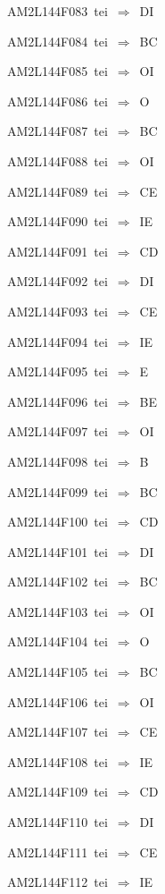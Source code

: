 {\sixrm AM2L144F083\ {\sixit tei}\ }$\Rightarrow$\ DI\par\smallskip
{\sixrm AM2L144F084\ {\sixit tei}\ }$\Rightarrow$\ BC\par\smallskip
{\sixrm AM2L144F085\ {\sixit tei}\ }$\Rightarrow$\ OI\par\smallskip
{\sixrm AM2L144F086\ {\sixit tei}\ }$\Rightarrow$\ O\par\smallskip
{\sixrm AM2L144F087\ {\sixit tei}\ }$\Rightarrow$\ BC\par\smallskip
{\sixrm AM2L144F088\ {\sixit tei}\ }$\Rightarrow$\ OI\par\smallskip
{\sixrm AM2L144F089\ {\sixit tei}\ }$\Rightarrow$\ CE\par\smallskip
{\sixrm AM2L144F090\ {\sixit tei}\ }$\Rightarrow$\ IE\par\smallskip
{\sixrm AM2L144F091\ {\sixit tei}\ }$\Rightarrow$\ CD\par\smallskip
{\sixrm AM2L144F092\ {\sixit tei}\ }$\Rightarrow$\ DI\par\smallskip
{\sixrm AM2L144F093\ {\sixit tei}\ }$\Rightarrow$\ CE\par\smallskip
{\sixrm AM2L144F094\ {\sixit tei}\ }$\Rightarrow$\ IE\par\smallskip
{\sixrm AM2L144F095\ {\sixit tei}\ }$\Rightarrow$\ E\par\smallskip
{\sixrm AM2L144F096\ {\sixit tei}\ }$\Rightarrow$\ BE\par\smallskip
{\sixrm AM2L144F097\ {\sixit tei}\ }$\Rightarrow$\ OI\par\smallskip
{\sixrm AM2L144F098\ {\sixit tei}\ }$\Rightarrow$\ B\par\smallskip
{\sixrm AM2L144F099\ {\sixit tei}\ }$\Rightarrow$\ BC\par\smallskip
{\sixrm AM2L144F100\ {\sixit tei}\ }$\Rightarrow$\ CD\par\smallskip
{\sixrm AM2L144F101\ {\sixit tei}\ }$\Rightarrow$\ DI\par\smallskip
{\sixrm AM2L144F102\ {\sixit tei}\ }$\Rightarrow$\ BC\par\smallskip
{\sixrm AM2L144F103\ {\sixit tei}\ }$\Rightarrow$\ OI\par\smallskip
{\sixrm AM2L144F104\ {\sixit tei}\ }$\Rightarrow$\ O\par\smallskip
{\sixrm AM2L144F105\ {\sixit tei}\ }$\Rightarrow$\ BC\par\smallskip
{\sixrm AM2L144F106\ {\sixit tei}\ }$\Rightarrow$\ OI\par\smallskip
{\sixrm AM2L144F107\ {\sixit tei}\ }$\Rightarrow$\ CE\par\smallskip
{\sixrm AM2L144F108\ {\sixit tei}\ }$\Rightarrow$\ IE\par\smallskip
{\sixrm AM2L144F109\ {\sixit tei}\ }$\Rightarrow$\ CD\par\smallskip
{\sixrm AM2L144F110\ {\sixit tei}\ }$\Rightarrow$\ DI\par\smallskip
{\sixrm AM2L144F111\ {\sixit tei}\ }$\Rightarrow$\ CE\par\smallskip
{\sixrm AM2L144F112\ {\sixit tei}\ }$\Rightarrow$\ IE\par\smallskip

